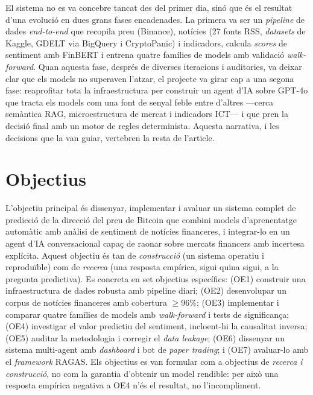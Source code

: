 \documentclass[10pt,twocolumn,a4paper]{article}
\begin{document}
El sistema no es va concebre tancat des del primer dia, sinó que és el resultat
d'una evolució en dues grans fases encadenades. La primera va ser un
\textit{pipeline} de dades \textit{end-to-end} que recopila preu (Binance),
notícies (27 fonts RSS, \textit{datasets} de Kaggle, GDELT via BigQuery i
CryptoPanic) i indicadors, calcula \textit{scores} de sentiment amb FinBERT i
entrena quatre famílies de models amb validació \textit{walk-forward}. Quan aquesta
fase, després de diverses iteracions i auditories, va deixar clar que els models
no superaven l'atzar, el projecte va girar cap a una segona fase: reaprofitar tota
la infraestructura per construir un agent d'IA sobre GPT-4o que tracta els models
com una font de senyal feble entre d'altres ---cerca semàntica RAG, microestructura
de mercat i indicadors ICT--- i que pren la decisió final amb un motor de regles
determinista. Aquesta narrativa, i les decisions que la van guiar, vertebren la
resta de l'article.

\section{Objectius}
L'objectiu principal és dissenyar, implementar i avaluar un sistema complet de
predicció de la direcció del preu de Bitcoin que combini models d'aprenentatge
automàtic amb anàlisi de sentiment de notícies financeres, i integrar-lo en un agent
d'IA conversacional capaç de raonar sobre mercats financers amb incertesa
explícita. Aquest objectiu és tan de \emph{construcció} (un sistema operatiu i
reproduïble) com de \emph{recerca} (una resposta empírica, sigui quina sigui, a la
pregunta predictiva). Es concreta en set objectius
específics: (OE1) construir una infraestructura de dades robusta amb pipeline
diari; (OE2) desenvolupar un corpus de notícies financeres amb cobertura
$\geq$96\%; (OE3) implementar i comparar quatre famílies de models amb
\textit{walk-forward} i tests de significança; (OE4) investigar el valor predictiu
del sentiment, incloent-hi la causalitat inversa; (OE5) auditar la metodologia i
corregir el \textit{data leakage}; (OE6) dissenyar un sistema multi-agent amb
\textit{dashboard} i bot de \textit{paper trading}; i (OE7) avaluar-lo amb el
\textit{framework} RAGAS. Els objectius es van formular com a objectius de
\emph{recerca i construcció}, no com la garantia d'obtenir un model rendible: per
això una resposta empírica negativa a OE4 n'és el resultat, no l'incompliment.
\end{document}
